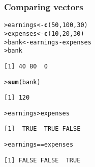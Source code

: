 \documentclass[13pt,aspectratio=169]{beamer}\usepackage[]{graphicx}\usepackage[]{color}
\makeatletter
\newcommand{\hlnum}[1]{\textcolor[rgb]{0.686,0.059,0.569}{#1}}%
\newcommand{\hlopt}[1]{\textcolor[rgb]{0,0,0}{#1}}%
\newcommand{\hlstd}[1]{\textcolor[rgb]{0.345,0.345,0.345}{#1}}%
\newcommand{\hlkwb}[1]{\textcolor[rgb]{0.69,0.353,0.396}{#1}}%
\newcommand{\hlkwd}[1]{\textcolor[rgb]{0.737,0.353,0.396}{\textbf{#1}}}%
\newenvironment{kframe}{%
 \def\at@end@of@kframe{}%
 \ifinner\ifhmode%
  \def\at@end@of@kframe{\end{minipage}}%
  \begin{minipage}{\columnwidth}%
 \fi\fi%
 \def\FrameCommand##1{\hskip\@totalleftmargin \hskip-\fboxsep
 \colorbox{shadecolor}{##1}\hskip-\fboxsep
     \hskip-\linewidth \hskip-\@totalleftmargin \hskip\columnwidth}%
 \MakeFramed {\advance\hsize-\width
   \@totalleftmargin\z@ \linewidth\hsize
   \@setminipage}}%
 {\par\unskip\endMakeFramed%
 \at@end@of@kframe}
\newenvironment{knitrout}{}{} %
\renewenvironment{knitrout}{\setlength{\topsep}{0mm}}{}
\makeatother
\begin{document}
\begin{frame}[fragile]
    \frametitle{Comparing vectors}
\begin{knitrout}\small
{}\color{fgcolor}\begin{kframe}
\begin{alltt}
\hlstd{> }\hlstd{earnings} \hlkwb{<-} \hlkwd{c}\hlstd{(}\hlnum{50}\hlstd{,} \hlnum{100}\hlstd{,} \hlnum{30}\hlstd{)}
\hlstd{> }\hlstd{expenses} \hlkwb{<-} \hlkwd{c}\hlstd{(}\hlnum{10}\hlstd{,} \hlnum{20}\hlstd{,} \hlnum{30}\hlstd{)}
\hlstd{> }\hlstd{bank} \hlkwb{<-} \hlstd{earnings} \hlopt{-} \hlstd{expenses}
\hlstd{> }\hlstd{bank}
\end{alltt}
\begin{verbatim}
[1] 40 80  0
\end{verbatim}
\begin{alltt}
\hlstd{> }\hlkwd{sum}\hlstd{(bank)}
\end{alltt}
\begin{verbatim}
[1] 120
\end{verbatim}
\begin{alltt}
\hlstd{> }\hlstd{earnings} \hlopt{>} \hlstd{expenses}
\end{alltt}
\begin{verbatim}
[1]  TRUE  TRUE FALSE
\end{verbatim}
\begin{alltt}
\hlstd{> }\hlstd{earnings} \hlopt{==} \hlstd{expenses}
\end{alltt}
\begin{verbatim}
[1] FALSE FALSE  TRUE
\end{verbatim}
\end{kframe}
\end{knitrout}
\end{frame}
\end{document}
